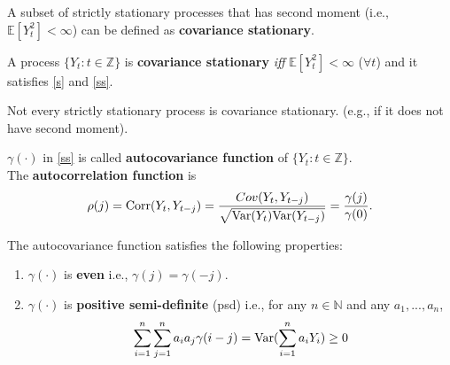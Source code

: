 \documentclass[11pt]{elegantbook}
\begin{document}
A subset of strictly stationary processes that has second moment (i.e., $\mathbb{E}[Y_t^2]<\infty$) can be defined as \textbf{covariance stationary}.
\begin{definition}
    A process $\{Y_t:t\in \mathbb{Z}\}$ is \textbf{covariance stationary} \textit{iff} $\mathbb{E}[Y_t^2]<\infty$ ($\forall t$) and it satisfies \eqref{s} and \eqref{ss}.
\end{definition}
\begin{note}
    Not every strictly stationary process is covariance stationary. (e.g., if it does not have second moment).
\end{note}


\begin{definition}
    $\gamma(\cdot)$ in \eqref{ss} is called \textbf{autocovariance function} of $\{Y_t:t\in \mathbb{Z}\}$.\\
    The \textbf{autocorrelation function} is
    \begin{equation}
        \begin{aligned}
            \rho(j)=\textnormal{Corr}(Y_t,Y_{t-j})=\frac{Cov(Y_t,Y_{t-j})}{\sqrt{\textnormal{Var}(Y_t)\textnormal{Var}(Y_{t-j})}}=\frac{\gamma(j)}{\gamma(0)}.
        \end{aligned}
        \nonumber
    \end{equation}
\end{definition}
\begin{lemma}
    The autocovariance function satisfies the following properties:
    \begin{enumerate}
        \item $\gamma(\cdot)$ is \textbf{even} i.e., $\gamma(j)=\gamma(-j)$.
        \item $\gamma(\cdot)$ is \textbf{positive semi-definite} (psd) i.e., for any  $n\in \mathbb{N}$ and any $a_1,...,a_n$,
        \begin{equation}
            \begin{aligned}
                \sum_{i=1}^n\sum_{j=1}^na_ia_j\gamma(i-j)=\textnormal{Var}(\sum_{i=1}^na_iY_i)\geq 0
            \end{aligned}
            \nonumber
        \end{equation}
    \end{enumerate}
\end{lemma}
\end{document}
